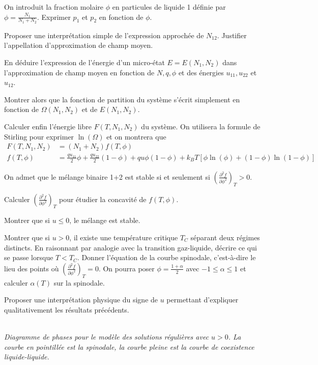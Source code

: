 \question
On introduit la fraction molaire $\phi$ en particules de liquide 1 définie par $\phi=\frac{N_1}{N_1+N_2}$. Exprimer $p_1$ et $p_2$ en fonction de $\phi$.

\question
Proposer une interprétation simple de l'expression approchée de $N_{12}$. Justifier l'appellation d'approximation de \og champ moyen\fg .

\question
En déduire l'expression de l'énergie d'un micro-état $E=E(N_1, N_2)$ dans l'approximation de champ moyen en fonction de $N, q, \phi$ et des énergies $u_{11}, u_{22}$ et $u_{12}$.

\question
Montrer alors que la fonction de partition du système s'écrit simplement en fonction de $\Omega(N_1, N_2)$ et de $E(N_1, N_2)$.

\question
Calculer enfin l'énergie libre $F(T,N_1,N_2)$ du système. On utilisera la formule de Stirling pour exprimer $\ln ( \Omega)$ et on montrera que
\begin{align*}
F(T,N_1,N_2)&=(N_1+N_2)f(T,\phi)\\
f(T,\phi)&=\frac{qu_{11}}{2} \phi +\frac{qu_{22}}{2} (1-\phi) +q u \phi(1-\phi)+k_BT \left[ \phi \ln (\phi)+(1-\phi) \ln (1-\phi) \right]
\end{align*}



On admet que le mélange binaire 1+2 est stable si et seulement si $\left(\frac{\partial^2f}{\partial \phi^2}\right)_T >0$.

\question
Calculer $\left(\frac{\partial^2f}{\partial \phi^2}\right)_T$ pour étudier la concavité de $f(T,\phi)$.

\question
Montrer que si $u \le 0$, le mélange est stable.

\question
Montrer que si $u > 0$, il existe une température critique $T_C$ séparant deux régimes distincts. En raisonnant par analogie avec la transition gaz-liquide, décrire ce qui se passe lorsque $T < T_C$. Donner l'équation de la courbe spinodale, c'est-à-dire le lieu des points où $\left(\frac{\partial^2f}{\partial \phi^2}\right)_T=0$. On pourra poser $\phi=\frac{1+\alpha}{2}$ avec $-1 \le \alpha \le 1$ et calculer $\alpha (T)$ sur la spinodale.

\question
Proposer une interprétation physique du signe de $u$ permettant d'expliquer qualitativement les résultats précédents.

\begin{center} \\
\textit{Diagramme de phases pour le modèle des solutions régulières avec $u > 0$. La courbe en pointillée est la spinodale, la courbe pleine est la courbe de coexistence liquide-liquide.}
\label{DPMB}
\end{center}
